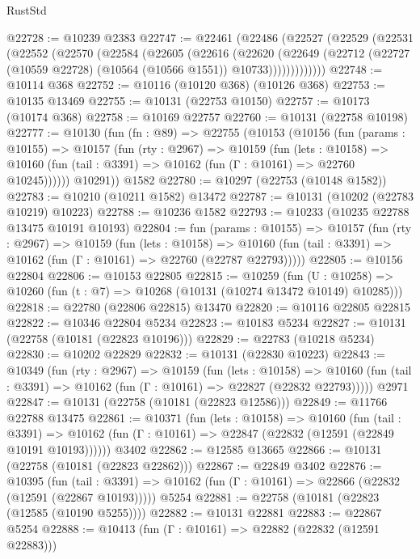 \begin{lexlean}{RustStd}
\begin{coremodule}
@22728 := @10239 @2383
@22747 := @22461
    (@22486
      (@22527
        (@22529
          (@22531
            (@22552
              (@22570
                (@22584
                  (@22605
                    (@22616
                      (@22620
                        (@22649
                          (@22712
                            (@22727 (@10559 @22728) (@10564 (@10566 @1551)) @10733)))))))))))))
@22748 := @10114 @368
@22752 := @10116 (@10120 @368) (@10126 @368)
@22753 := @10135 @13469
@22755 := @10131 (@22753 @10150)
@22757 := @10173 (@10174 @368)
@22758 := @10169 @22757
@22760 := @10131 (@22758 @10198)
@22777 := @10130
    (fun (fn : @89) =>
    @22755
      (@10153
        (@10156
          (fun (params : @10155) =>
          @10157
            (fun (rty : @2967) =>
            @10159
              (fun (lets : @10158) =>
              @10160 (fun (tail : @3391) => @10162 (fun (Γ : @10161) => @22760 @10245))))))
        @10291))
    @1582
@22780 := @10297 (@22753 (@10148 @1582))
@22783 := @10210 (@10211 @1582) @13472
@22787 := @10131 (@10202 (@22783 @10219) @10223)
@22788 := @10236 @1582
@22793 := @10233 (@10235 @22788 @13475 @10191 @10193)
@22804 := fun (params : @10155) =>
  @10157
    (fun (rty : @2967) =>
    @10159
      (fun (lets : @10158) =>
      @10160 (fun (tail : @3391) => @10162 (fun (Γ : @10161) => @22760 (@22787 @22793)))))
@22805 := @10156 @22804
@22806 := @10153 @22805
@22815 := @10259
    (fun (U : @10258) => @10260 (fun (t : @7) => @10268 (@10131 (@10274 @13472 @10149) @10285)))
@22818 := @22780 (@22806 @22815) @13470
@22820 := @10116 @22805 @22815
@22822 := @10346 @22804 @5234
@22823 := @10183 @5234
@22827 := @10131 (@22758 (@10181 (@22823 @10196)))
@22829 := @22783 (@10218 @5234)
@22830 := @10202 @22829
@22832 := @10131 (@22830 @10223)
@22843 := @10349
    (fun (rty : @2967) =>
    @10159
      (fun (lets : @10158) =>
      @10160 (fun (tail : @3391) => @10162 (fun (Γ : @10161) => @22827 (@22832 @22793)))))
    @2971
@22847 := @10131 (@22758 (@10181 (@22823 @12586)))
@22849 := @11766 @22788 @13475
@22861 := @10371
    (fun (lets : @10158) =>
    @10160
      (fun (tail : @3391) =>
      @10162 (fun (Γ : @10161) => @22847 (@22832 (@12591 (@22849 @10191 @10193))))))
    @3402
@22862 := @12585 @13665
@22866 := @10131 (@22758 (@10181 (@22823 @22862)))
@22867 := @22849 @3402
@22876 := @10395
    (fun (tail : @3391) => @10162 (fun (Γ : @10161) => @22866 (@22832 (@12591 (@22867 @10193)))))
    @5254
@22881 := @22758 (@10181 (@22823 (@12585 (@10190 @5255))))
@22882 := @10131 @22881
@22883 := @22867 @5254
@22888 := @10413 (fun (Γ : @10161) => @22882 (@22832 (@12591 @22883)))

\end{coremodule}
\end{lexlean}
